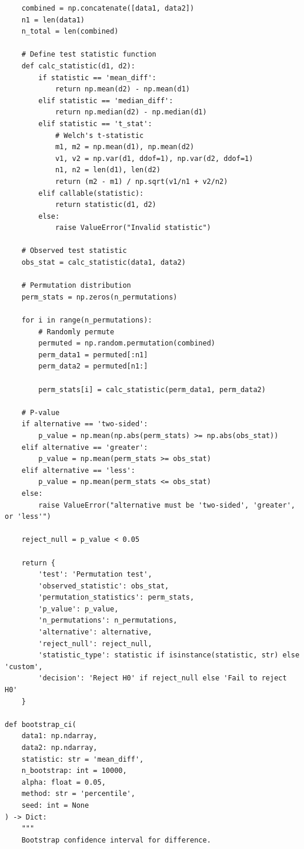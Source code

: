 \begin{lstlisting}
    combined = np.concatenate([data1, data2])
    n1 = len(data1)
    n_total = len(combined)

    # Define test statistic function
    def calc_statistic(d1, d2):
        if statistic == 'mean_diff':
            return np.mean(d2) - np.mean(d1)
        elif statistic == 'median_diff':
            return np.median(d2) - np.median(d1)
        elif statistic == 't_stat':
            # Welch's t-statistic
            m1, m2 = np.mean(d1), np.mean(d2)
            v1, v2 = np.var(d1, ddof=1), np.var(d2, ddof=1)
            n1, n2 = len(d1), len(d2)
            return (m2 - m1) / np.sqrt(v1/n1 + v2/n2)
        elif callable(statistic):
            return statistic(d1, d2)
        else:
            raise ValueError("Invalid statistic")

    # Observed test statistic
    obs_stat = calc_statistic(data1, data2)

    # Permutation distribution
    perm_stats = np.zeros(n_permutations)

    for i in range(n_permutations):
        # Randomly permute
        permuted = np.random.permutation(combined)
        perm_data1 = permuted[:n1]
        perm_data2 = permuted[n1:]

        perm_stats[i] = calc_statistic(perm_data1, perm_data2)

    # P-value
    if alternative == 'two-sided':
        p_value = np.mean(np.abs(perm_stats) >= np.abs(obs_stat))
    elif alternative == 'greater':
        p_value = np.mean(perm_stats >= obs_stat)
    elif alternative == 'less':
        p_value = np.mean(perm_stats <= obs_stat)
    else:
        raise ValueError("alternative must be 'two-sided', 'greater', or 'less'")

    reject_null = p_value < 0.05

    return {
        'test': 'Permutation test',
        'observed_statistic': obs_stat,
        'permutation_statistics': perm_stats,
        'p_value': p_value,
        'n_permutations': n_permutations,
        'alternative': alternative,
        'reject_null': reject_null,
        'statistic_type': statistic if isinstance(statistic, str) else 'custom',
        'decision': 'Reject H0' if reject_null else 'Fail to reject H0'
    }

def bootstrap_ci(
    data1: np.ndarray,
    data2: np.ndarray,
    statistic: str = 'mean_diff',
    n_bootstrap: int = 10000,
    alpha: float = 0.05,
    method: str = 'percentile',
    seed: int = None
) -> Dict:
    """
    Bootstrap confidence interval for difference.


\end{lstlisting}
